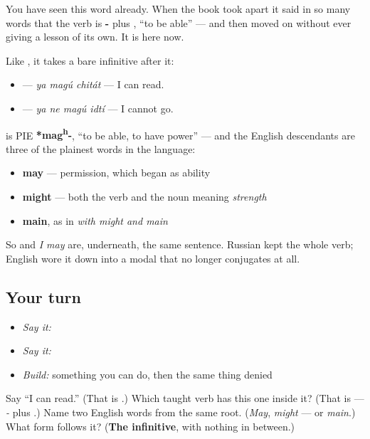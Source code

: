 You have seen this word already. When the book took \textbf{} apart it said in so many words that the verb is \textbf{-} plus \textbf{}, \textquotedblleft{}to be able\textquotedblright{} — and then moved on without ever giving \textbf{} a lesson of its own. It is here now.

Like \textbf{}, it takes a bare infinitive after it:

\begin{itemize}
\raggedright
  \item \textbf{  } — \emph{ya magú chitát} — I can read.
  \item \textbf{   } — \emph{ya ne magú idtí} — I cannot go.
\end{itemize}

\begin{cousinweb}
\textbf{} is PIE \textbf{*mag\textsuperscript{h}-}, \textquotedblleft{}to be able, to have power\textquotedblright{} — and the English descendants are three of the plainest words in the language:

\begin{itemize}
\raggedright
  \item \textbf{may} — permission, which began as ability
  \item \textbf{might} — both the verb and the noun meaning \emph{strength}
  \item \textbf{main}, as in \emph{with might and main}
\end{itemize}

So \emph{ } and \emph{I may} are, underneath, the same sentence. Russian kept the whole verb; English wore it down into a modal that no longer conjugates at all.
\end{cousinweb}

\subsection*{Your turn}
\begin{itemize}
\raggedright
  \item \emph{Say it:} \emph{  }
  \item \emph{Say it:} \emph{   }
  \item \emph{Build:} something you can do, then the same thing denied
\end{itemize}

\begin{tcolorbox}[breakable,colback=teal!4,colframe=teal!35!black,title={Before you move on}]
Say \textquotedblleft{}I can read.\textquotedblright{} (That is \textbf{  }.) Which taught verb has this one inside it? (That is \textbf{} — \emph{-} plus \emph{}.) Name two English words from the same root. (\emph{May}, \emph{might} — or \emph{main}.) What form follows it? (\textbf{The infinitive}, with nothing in between.)
\end{tcolorbox}
